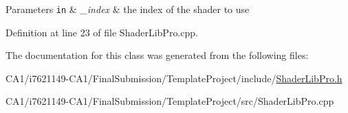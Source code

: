 \begin{DoxyParams}[1]{Parameters}
\mbox{\tt in}  & {\em \-\_\-index} & the index of the shader to use \\
\hline
\end{DoxyParams}


Definition at line 23 of file Shader\-Lib\-Pro.\-cpp.



The documentation for this class was generated from the following files\-:\begin{DoxyCompactItemize}
\item 
C\-A1/i7621149-\/\-C\-A1/\-Final\-Submission/\-Template\-Project/include/\hyperlink{_shader_lib_pro_8h}{Shader\-Lib\-Pro.\-h}\item 
C\-A1/i7621149-\/\-C\-A1/\-Final\-Submission/\-Template\-Project/src/Shader\-Lib\-Pro.\-cpp\end{DoxyCompactItemize}
